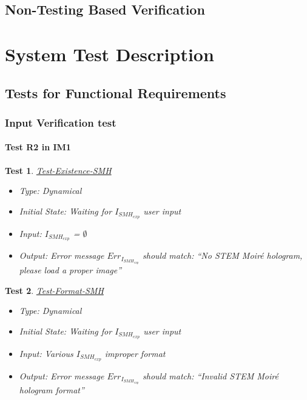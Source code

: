 \documentclass[12pt, titlepage]{article}
\newtheorem{Test}{Test}
\begin{document}

\subsection{Non-Testing Based Verification}


\section{System Test Description}
	
\subsection{Tests for Functional Requirements}
\renewcommand{\labelitemi}{$\star$}

\subsubsection{Input Verification test}

\paragraph{Test R2 in IM1}

\begin{Test}\normalfont\underline{Test-Existence-SMH}
\begin{itemize}
\item Type: Dynamical
\item Initial State: Waiting for $I_{SMH_{exp}}$ user input
\item Input: $I_{SMH_{exp}}$ = $\emptyset$
\item Output: Error message $Err_{I_{SMH_{exp}}}$ should match: \enquote{No STEM Moir{\'e} hologram, please load a proper image}
\end{itemize}
\end{Test}

\begin{Test}\normalfont\underline{Test-Format-SMH}
\begin{itemize}
\item Type: Dynamical
\item Initial State: Waiting for $I_{SMH_{exp}}$ user input
\item Input: Various $I_{SMH_{exp}}$ improper format
\item Output: Error message $Err_{I_{SMH_{exp}}}$ should match: \enquote{Invalid STEM Moir{\'e} hologram format}
\end{itemize}
\end{Test}
\end{document}
